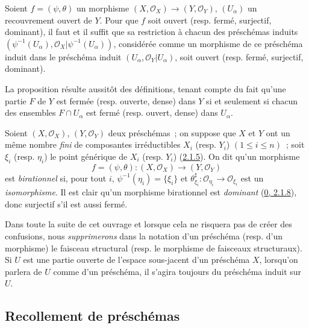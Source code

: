 \begin{proposition}[2.2.8]
\label{I.2.2.8-fr}
Soient $f=(\psi,\theta)$ un morphisme
$(X,\mathscr{O}_X)\to(Y,\mathscr{O}_Y)$, $(U_\alpha)$ un recouvrement ouvert
de $Y$. Pour que $f$ soit ouvert (resp. fermé, surjectif, dominant), il faut
et il suffit que sa restriction à chacun des préschémas induits
$(\psi^{-1}(U_\alpha),\mathscr{O}_X|\psi^{-1}(U_\alpha))$, considérée comme
un morphisme de ce préschéma induit dans le préschéma induit
$(U_\alpha,\mathscr{O}_Y|U_\alpha)$, soit ouvert (resp. fermé, surjectif,
dominant).
\end{proposition}

La proposition résulte aussitôt des définitions, tenant compte du fait qu'une
partie $F$ de $Y$ est fermée (resp. ouverte, dense) dans $Y$ si et seulement
si chacun des ensembles $F\cap U_\alpha$ est fermé (resp. ouvert, dense) dans
$U_\alpha$.

\begin{env}[2.2.9]
\label{I.2.2.9-fr}
Soient $(X,\mathscr{O}_X)$, $(Y,\mathscr{O}_Y)$ deux préschémas~; on suppose
que $X$ et $Y$ ont un même nombre \emph{fini} de composantes irréductibles
$X_i$ (resp. $Y_i$) $(1\leq i\leq n)$~; soit $\xi_i$ (resp. $\eta_i$) le
point générique de $X_i$ (resp. $Y_i$)
(\hyperref[I.2.1.5-fr]{2.1.5}). On dit qu'un morphisme
\[
  f=(\psi,\theta):(X,\mathscr{O}_X)\to(Y,\mathscr{O}_Y)
\]
est \emph{birationnel} si, pour tout $i$, $\psi^{-1}(\eta_i)=\{\xi_i\}$ et
$\theta_{\xi_i}^{\sharp}:\mathscr{O}_{\eta_i}\to\mathscr{O}_{\xi_i}$ est un
\emph{isomorphisme}. Il est clair qu'un morphisme birationnel est
\emph{dominant} (\hyperref[0.2.1.8-fr]{0, 2.1.8}), donc surjectif s'il est
aussi fermé.
\end{env}

\begin{notation}[2.2.10]
\label{I.2.2.10-fr}
Dans toute la suite de cet ouvrage et lorsque cela ne risquera pas de créer
des confusions, nous \emph{supprimerons} dans la notation d'un préschéma
(resp. d'un morphisme) le faisceau structural (resp. le morphisme de faisceaux
structuraux). Si $U$ est une partie ouverte de l'espace sous-jacent d'un
préschéma $X$, lorsqu'on parlera de $U$ comme d'un préschéma, il s'agira
toujours du préschéma induit sur $U$.
\end{notation}

\subsection{Recollement de préschémas}
\label{subsection:I.2.3-fr}

